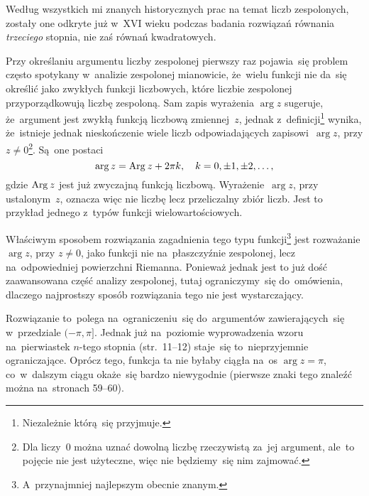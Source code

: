 \documentclass[a4paper,11pt]{article}
\begin{document}
\vspace{\spaceFour}


\start {} Według wszystkich mi znanych historycznych prac na
temat liczb zespolonych, zostały one odkryte już w~XVI wieku podczas
badania rozwiązań równania \emph{trzeciego} stopnia, nie zaś równań
kwadratowych. 

\vspace{\spaceFour}


\start {} Przy określaniu argumentu liczby zespolonej pierwszy
raz pojawia~się problem często spotykany w~analizie zespolonej
mianowicie, że~wielu funkcji nie da~się określić jako zwykłych funkcji
liczbowych, które liczbie zespolonej przyporządkowują liczbę
zespoloną. Sam zapis wyrażenia $\arg z$ sugeruje, że~argument jest
zwykłą funkcją liczbową zmiennej~$z$, jednak
z~definicji\footnote{Niezależnie którą~się przyjmuje.} wynika,
że~istnieje jednak nieskończenie wiele liczb odpowiadających
zapisowi~$\arg z$, przy $z \neq 0$\footnote{Dla liczy~$0$ można uznać
  dowolną liczbę rzeczywistą za~jej argument, ale~to pojęcie nie jest
  użyteczne, więc nie będziemy~się nim zajmować.}. Są~one postaci
\begin{equation}
  \label{eq:Leja-06}
  \arg z = \textrm{Arg}\: z + 2\pi k, \quad k = 0, \pm 1, \pm 2,\ldots,
\end{equation}
gdzie $\textrm{Arg}\: z$ jest już zwyczajną funkcją liczbową.
Wyrażenie~$\arg z$, przy ustalonym~$z$, oznacza więc nie liczbę lecz
przeliczalny zbiór liczb. Jest to przykład jednego z~typów funkcji
wielowartościowych.

Właściwym sposobem rozwiązania zagadnienia tego typu
funkcji\footnote{A~przynajmniej najlepszym obecnie znanym.} jest
rozważanie $\arg z$, przy $z \neq 0$, jako funkcji nie na~płaszczyźnie
zespolonej, lecz na~odpowiedniej powierzchni Riemanna. Ponieważ jednak
jest to już dość zaawansowana część analizy zespolonej, tutaj
ograniczymy~się do~omówienia, dlaczego najprostszy sposób rozwiązania
tego nie jest wystarczający.

Rozwiązanie to~polega na~ograniczeniu~się do~argumentów
zawierających~się w~przedziale $( -\pi, \pi ]$. Jednak już na~poziomie
wyprowadzenia wzoru na~pierwiastek $n$-tego stopnia (str.~11--12)
staje~się to~nieprzyjemnie ograniczające. Oprócz tego, funkcja ta nie
byłaby ciągła na~os $\arg z = \pi$, co~w~dalszym ciągu okaże~się
bardzo niewygodnie (pierwsze znaki tego znaleźć można na~stronach
59--60).

\vspace{\spaceFour}
\end{document}

